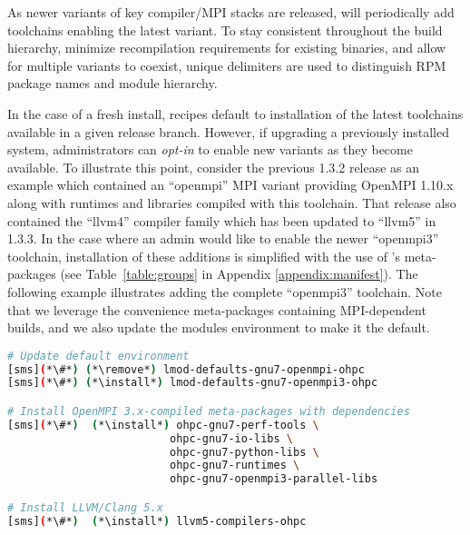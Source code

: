 As newer variants of key compiler/MPI stacks are released, \OHPC{} will
periodically add toolchains enabling the latest variant. To stay consistent
throughout the build hierarchy, minimize recompilation requirements for existing
binaries, and allow for multiple variants to coexist, unique delimiters are
used to distinguish RPM package names and module hierarchy.

In the case of a fresh install, \OHPC{} recipes default to installation of the
latest toolchains available in a given release branch. However, if upgrading a
previously installed system, administrators can {\em opt-in} to enable new
variants as they become available. To illustrate this point, consider the
previous \OHPC{} 1.3.2 release as an example which contained an {``openmpi''}
MPI variant providing OpenMPI 1.10.x along with runtimes and libraries compiled
with this toolchain. That release also contained the {``llvm4''} compiler
family which has been updated to {``llvm5''} in \OHPC{} 1.3.3.  In the case
where an admin would like to enable the newer {``openmpi3''} toolchain,
installation of these additions is simplified with the use of \OHPC{}'s
meta-packages (see Table~\ref{table:groups} in Appendix
\ref{appendix:manifest}).  The following example illustrates adding the
complete ``openmpi3'' toolchain.  Note that we leverage the convenience
meta-packages containing MPI-dependent builds, and we also update the
modules environment to make it the default.

\begin{lstlisting}[language=bash,keywords={}]
# Update default environment
[sms](*\#*) (*\remove*) lmod-defaults-gnu7-openmpi-ohpc
[sms](*\#*) (*\install*) lmod-defaults-gnu7-openmpi3-ohpc

# Install OpenMPI 3.x-compiled meta-packages with dependencies
[sms](*\#*)  (*\install*) ohpc-gnu7-perf-tools \
                         ohpc-gnu7-io-libs \
                         ohpc-gnu7-python-libs \
                         ohpc-gnu7-runtimes \
                         ohpc-gnu7-openmpi3-parallel-libs

# Install LLVM/Clang 5.x
[sms](*\#*)  (*\install*) llvm5-compilers-ohpc
\end{lstlisting}

